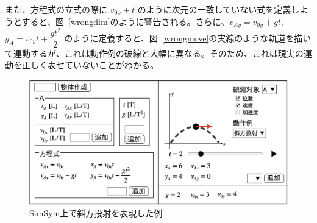 \documentclass[11pt, a4paper, oneside, twocolumn, dvipdfmx]{jsarticle}
\newcommand{\simname}{SimSym}
\begin{document}
また、方程式の立式の際に $v_{0x} + t$ のように次元の一致していない式を定義しようとすると、図~\ref{wrongdim}のように警告される。さらに、$v_{Ay} = v_{0y} + gt$, $y_A = v_{0y}t + \dfrac{gt^2}{2}$ のように定義すると、図~\ref{wrongmove}の実線のような軌道を描いて運動するが、これは動作例の破線と大幅に異なる。そのため、これは現実の運動を正しく表せていないことがわかる。

\begin{figure}[htb]
  \centering
  \includegraphics*[width=\linewidth]{work/slide_img5-crop.png}
  \caption{\simname 上で斜方投射を表現した例} \label{simsym_fig1}
\end{figure}
\end{document}
